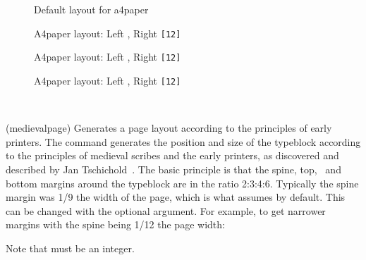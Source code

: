 \begin{figure}[p]
\begin{fullpage}
\centering
\begin{minipage}[b]{\pwlayi}
\end{minipage}
\caption{Default layout for a4paper}

\begin{minipage}[b]{\pwlayi}
\end{minipage}
\hfill
\begin{minipage}[b]{\pwlayi}
\end{minipage}
\caption{A4paper layout: Left , Right \texttt{[12]}}

\begin{minipage}[b]{\pwlayi}
\end{minipage}
\hfill
\begin{minipage}[b]{\pwlayi}
\end{minipage} 
\caption{A4paper layout: Left , Right \texttt{[12]}}

\begin{minipage}[b]{\pwlayi}
\end{minipage}
\hfill
\begin{minipage}[b]{\pwlayi}
\end{minipage}
\caption{A4paper layout: Left , Right \texttt{[12]}} \label{fig:pagelastlay}
\end{fullpage}
\end{figure}





\begin{syntax}
\cmd{\medievalpage} \\
\end{syntax}
\glossary(medievalpage)%
  {}%
  {Generates a page layout according to the principles of early printers.}
The \cmd{\medievalpage} command generates the position and size of the 
typeblock according to the principles of medieval scribes and the early 
printers, as discovered and described by Jan Tschichold~\cite{TSCHICHOLD91}.
The basic principle is that the 
spine, top, \foredge\ and bottom margins 
around the typeblock are in the ratio 2:3:4:6. Typically the spine margin
was 1/9 the width of the page, which is what \cmd{\medievalpage} assumes
by default. This can be changed with the optional  argument. For
example, to get narrower margins with the spine being 1/12 the page width:
\begin{lcode}
\medievalpage[12]
\end{lcode}
Note that  must be an integer.

